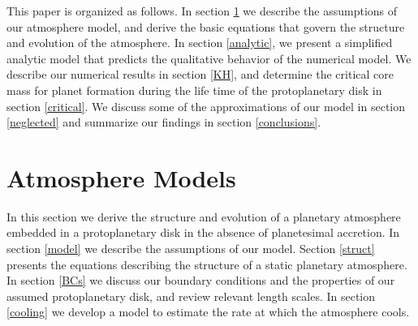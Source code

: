 \documentclass[apj]{emulateapj}
\begin{document}


This paper is organized as follows. In section \ref{sec2} we describe the assumptions of our atmosphere model, and derive the basic equations that govern the structure and evolution of the atmosphere. In section \ref{analytic}, we present a simplified analytic model that predicts the qualitative behavior of the numerical model. We describe our numerical results in section \ref{KH}, and determine the critical core mass for planet formation during the life time of the protoplanetary disk in section \ref{critical}.  We discuss some of the approximations of our model in section \ref{neglected} and summarize our findings in section \ref{conclusions}.





\section{Atmosphere Models}
\label{sec2}

In this section we derive the structure and evolution of a planetary atmosphere embedded in a protoplanetary disk in the absence of planetesimal accretion. In section \ref{model} we describe the assumptions of our model. Section \ref{struct} presents the equations describing the structure of a static planetary atmosphere.  In section \ref{BCs} we discuss our boundary conditions and the properties of our assumed protoplanetary disk, and review relevant length scales.  In section \ref{cooling} we develop a model to estimate the rate at which the atmosphere cools. %
\end{document}
